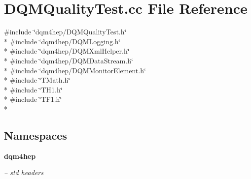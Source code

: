 \section{D\+Q\+M\+Quality\+Test.\+cc File Reference}
\label{DQMQualityTest_8cc}
{\ttfamily \#include \char`\"{}dqm4hep/\+D\+Q\+M\+Quality\+Test.\+h\char`\"{}}\\*
{\ttfamily \#include \char`\"{}dqm4hep/\+D\+Q\+M\+Logging.\+h\char`\"{}}\\*
{\ttfamily \#include \char`\"{}dqm4hep/\+D\+Q\+M\+Xml\+Helper.\+h\char`\"{}}\\*
{\ttfamily \#include \char`\"{}dqm4hep/\+D\+Q\+M\+Data\+Stream.\+h\char`\"{}}\\*
{\ttfamily \#include \char`\"{}dqm4hep/\+D\+Q\+M\+Monitor\+Element.\+h\char`\"{}}\\*
{\ttfamily \#include \char`\"{}T\+Math.\+h\char`\"{}}\\*
{\ttfamily \#include \char`\"{}T\+H1.\+h\char`\"{}}\\*
{\ttfamily \#include \char`\"{}T\+F1.\+h\char`\"{}}\\*
\subsection*{Namespaces}
\begin{DoxyCompactItemize}
\item 
 {\bf dqm4hep}
\begin{DoxyCompactList}\small\item\em -- std headers \end{DoxyCompactList}\end{DoxyCompactItemize}
